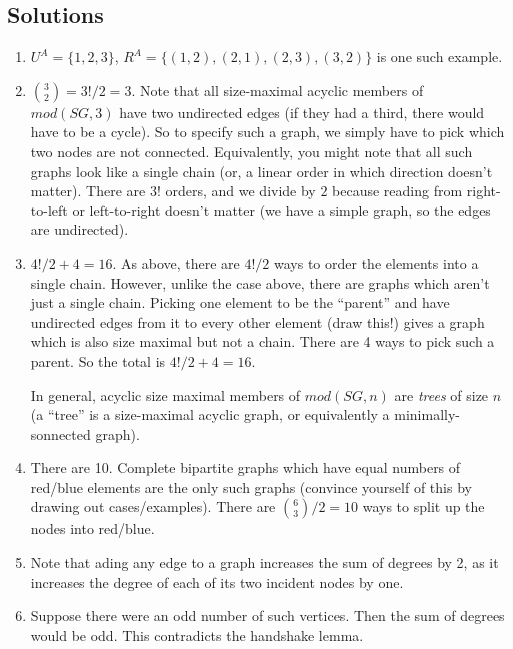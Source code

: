 \newpage
\begin{mdframed}[linewidth=1]
\section*{Solutions}
\begin{enumerate}
    \item $U^A = \{1, 2, 3\}$, $R^A = \{(1, 2), (2, 1), (2, 3), (3, 2)\}$ is one such example. 

    \item $\binom{3}{2} = 3!/2 = 3$. Note that all size-maximal acyclic members of $mod(SG, 3)$ have two undirected edges (if they had a third, there would have to be a cycle). So to specify such a graph, we simply have to pick which two nodes are not connected. Equivalently, you might note that all such graphs look like a single chain (or, a linear order in which direction doesn't matter). There are $3!$ orders, and we divide by $2$ because reading from right-to-left or left-to-right doesn't matter (we have a simple graph, so the edges are undirected). 

    \item $4!/2 + 4 = 16$. As above, there are $4!/2$ ways to order the elements into a single chain. However, unlike the case above, there are graphs which aren't just a single chain. Picking one element to be the ``parent'' and have undirected edges from it to every other element (draw this!) gives a graph which is also size maximal but not a chain. There are 4 ways to pick such a parent. So the total is $4!/2 + 4 = 16$. 

    In general, acyclic size maximal members of $mod(SG, n)$ are \emph{trees} of size $n$ (a ``tree'' is a size-maximal acyclic graph, or equivalently a minimally-sonnected graph). 

    \item There are 10. Complete bipartite graphs which have equal numbers of red/blue elements are the only such graphs (convince yourself of this by drawing out cases/examples). There are $\binom{6}{3}/2 = 10$ ways to split up the nodes into red/blue.

    \item Note that ading any edge to a graph increases the sum of degrees by 2, as it increases the degree of each of its two incident nodes by one. 

    \item Suppose there were an odd number of such vertices. Then the sum of degrees would be odd. This contradicts the handshake lemma.


\end{enumerate}
\end{mdframed}
